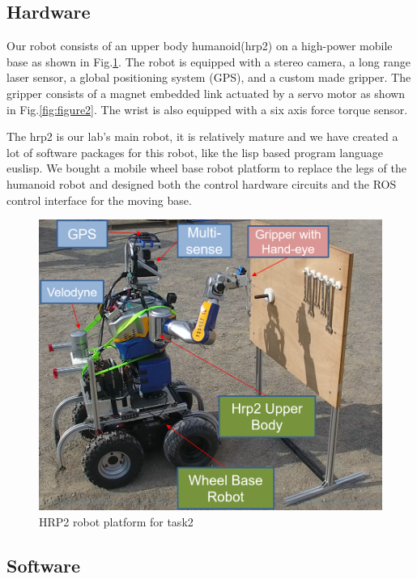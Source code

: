 \documentclass{standalone}
\begin{document}
\subsection{Hardware}
Our robot consists of an upper body humanoid(hrp2) on a high-power mobile base as shown in Fig.\ref{fig:figure1}. The robot is equipped with a stereo camera, a long range laser sensor, a global positioning system (GPS), and a custom made gripper. The gripper consists of a magnet embedded link actuated by a servo motor as shown in Fig.\ref{fig:figure2}. The wrist is also equipped with a six axis force torque sensor.

The hrp2 is our lab's main robot, it is relatively mature and we have created a lot of software packages for this robot, like the lisp based program language euslisp. %
We bought a mobile wheel base robot platform to replace the legs of the humanoid robot and designed both the control hardware circuits and the ROS control interface for the moving base.


\begin{figure}[t]
  \includegraphics[width=\columnwidth]{sections/task2/images/hrp2}
  \caption{HRP2 robot platform for task2}
  \label{fig:figure1}
\end{figure}

\subsection{Software}
\end{document}
